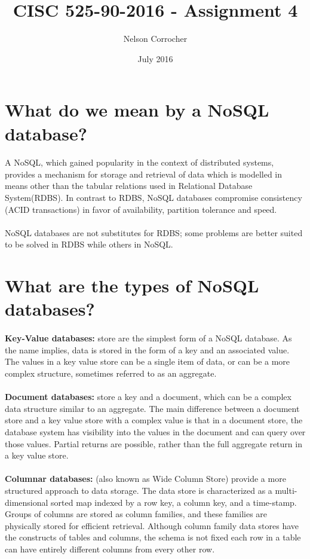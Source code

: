 \documentclass[11pt, a4paper]{article}
\title{CISC 525-90-2016 - Assignment 4}
\author{Nelson Corrocher}
\date{July 2016}
\begin{document}
\maketitle
\section{What do we mean by a NoSQL database?}
\paragraph{}A NoSQL, which gained popularity in the context of distributed systems, provides a mechanism for storage and retrieval of data which is modelled in means other than the tabular relations used in Relational Database System(RDBS). In contrast to RDBS, NoSQL databases compromise consistency (ACID transactions) in favor of availability, partition tolerance and speed.
\paragraph{}NoSQL databases are not substitutes for RDBS; some problems are better suited to be solved in RDBS while others in NoSQL.

\section{What are the types of NoSQL databases?}  
\paragraph{}\textbf{Key-Value databases:} store are the simplest form of a NoSQL database. As the name implies, data is stored in the form of a key and an associated value. The values in a key value store can be a single item of data, or can be a more complex structure, sometimes referred to as an aggregate.
\paragraph{}\textbf{Document databases:} store a key and a document, which can be a complex data structure similar to an aggregate.  The main difference between a document store and a key value store with a complex value is that in a document store, the database system has visibility into the values in the document and can query over those values.  Partial returns are possible, rather than the full aggregate return in a key value store.
\paragraph{}\textbf{Columnar databases:} (also known as Wide Column Store) provide a more structured approach to data storage. The data store is characterized as a multi-dimensional sorted map indexed by a row key, a column key, and a time-stamp. Groups of columns are stored as column families, and these families are physically stored for efficient retrieval. Although column family data stores have the constructs of tables and columns, the schema is not fixed each row in a table can have entirely different columns from every other row.
\end{document}
